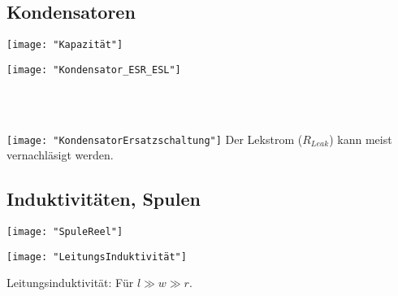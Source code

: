 \subsection{Kondensatoren}
\begin{minipage}[t]{0.2\textwidth}
	\vspace{0pt}
	\texttt{[image: "Kapazität"]}
\end{minipage}\hspace{0.00\textwidth}
\begin{minipage}[t]{0.2\textwidth}
	\vspace{0pt}
	\texttt{[image: "Kondensator\_ESR\_ESL"]}
\end{minipage}\hspace{0.05\textwidth}
\begin{minipage}[t]{0.2\textwidth}
	\vspace{0pt}
	\\
	\\
\end{minipage}\hspace{0.05\textwidth}
\begin{minipage}[t]{0.3\textwidth}
	\vspace{0pt}
	\texttt{[image: "KondensatorErsatzschaltung"]}
	Der Lekstrom ($R_{Leak}$) kann meist vernachläsigt werden.
\end{minipage}
\vspace{2mm}


\subsection{Induktivitäten, Spulen}
\begin{minipage}[t]{0.3\textwidth}
	\vspace{0pt}
	\texttt{[image: "SpuleReel"]}
\end{minipage}\hspace{0.05\textwidth}
\begin{minipage}[t]{0.3\textwidth}
	\vspace{0pt}
	\texttt{[image: "LeitungsInduktivität"]}
\end{minipage}\hspace{0.05\textwidth}
\begin{minipage}[t]{0.3\textwidth}
	\vspace{0pt}
	Leitungsinduktivität:
	Für $l \gg w\gg r$.
\end{minipage}
\vspace{2mm}









